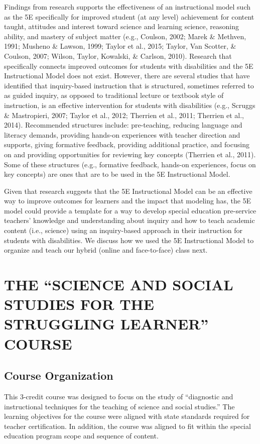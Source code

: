 \documentclass[11.5pt]{sig-alternate} %
\begin{document}
\begin{large}
Findings from research supports the effectiveness of an instructional model such as the 5E specifically for improved student (at any level) achievement for content taught, attitudes and interest toward science and learning science, reasoning ability, and mastery of subject matter (e.g., Coulson, 2002;  Marek \& Methven, 1991; Musheno \& Lawson, 1999; Taylor et al., 2015; Taylor, Van Scotter, \& Coulson, 2007; Wilson, Taylor, Kowalski, \& Carlson, 2010). Research that specifically connects improved outcomes for students with disabilities and the 5E Instructional Model does not exist. However, there are several studies that have identified that inquiry-based instruction that is structured, sometimes referred to as guided inquiry, as opposed to traditional lecture or textbook style of instruction, is an effective intervention for students with disabilities (e.g., Scruggs \& Mastropieri, 2007; Taylor et al., 2012; Therrien et al., 2011; Therrien et al., 2014). Recommended structures include: pre-teaching, reducing language and literacy demands, providing hands-on experiences with teacher direction and supports, giving formative feedback, providing additional practice, and focusing on and providing opportunities for reviewing key concepts (Therrien et al., 2011). Some of these structures (e.g., formative feedback, hands-on experiences, focus on key concepts) are ones that are to be used in the 5E Instructional Model.  

Given that research suggests that the 5E Instructional Model can be an effective way to improve outcomes for learners and the impact that modeling has, the 5E model could provide a template for a way to develop special education pre-service teachers’ knowledge and understanding about inquiry and how to teach academic content (i.e., science) using an inquiry-based approach in their instruction for students with disabilities. We discuss how we used the 5E Instructional Model to organize and teach our hybrid (online and face-to-face) class next.

\section*{THE “SCIENCE AND SOCIAL STUDIES FOR THE STRUGGLING LEARNER” COURSE}

\subsection*{Course Organization}

This 3-credit course was designed to focus on the study of  “diagnostic and instructional techniques for the teaching of science and social studies.” The learning objectives for the course were aligned with state standards required for teacher certification. In addition, the course was aligned to fit within the special education program scope and sequence of content.  


\end{large}
\end{document}

